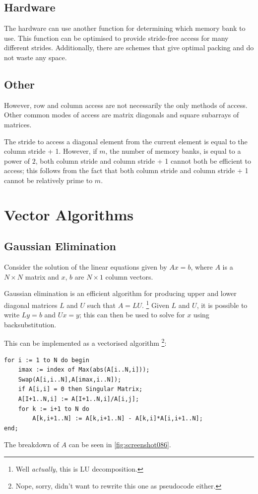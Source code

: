 \subsection{Hardware}
The hardware can use another function for determining which memory bank to use. This function can be optimised to provide stride-free access for many different strides. Additionally, there are schemes that give optimal packing and do not waste any space.

\subsection{Other}
However, row and column access are not necessarily the only methods of access. Other common modes of access are matrix diagonals and square subarrays of matrices.

The stride to access a diagonal element from the current element is equal to the column stride + 1. However, if $m$, the number of memory banks, is equal to a power of $2$, both column stride and column stride + 1 cannot both be efficient to access; this follows from the fact that both column stride and column stride + 1 cannot be relatively prime to $m$.

\section{Vector Algorithms}
\subsection{Gaussian Elimination}
Consider the solution of the linear equations given by $Ax = b$, where $A$ is a $N \times N$ matrix and $x$, $b$ are $N \times 1$ column vectors.

Gaussian elimination is an efficient algorithm for producing upper and lower diagonal matrices $L$ and $U$ such that $A = LU$. \footnote{Well \textit{actually}, this is LU decomposition.} Given $L$ and $U$, it is possible to write $Ly = b$ and $Ux = y$; this can then be used to solve for $x$ using backsubstitution.

This can be implemented as a vectorised algorithm \footnote{Nope, sorry, didn't want to rewrite this one as pseudocode either.}:
\begin{lstlisting}
for i := 1 to N do begin 
	imax := index of Max(abs(A[i..N,i])); 
	Swap(A[i,i..N],A[imax,i..N]); 
	if A[i,i] = 0 then Singular Matrix; 
	A[I+1..N,i] := A[I+1..N,i]/A[i,j]; 
	for k := i+1 to N do 
		A[k,i+1..N] := A[k,i+1..N] - A[k,i]*A[i,i+1..N]; 
end; 
\end{lstlisting}
The breakdown of $A$ can be seen in \autoref{fig:screenshot086}.

